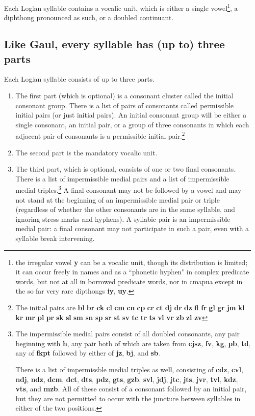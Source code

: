 \documentclass[12pt]{book}
\begin{document}
Each Loglan syllable contains a vocalic unit, which is either a single vowel\footnote{the irregular vowel {\bf y} can be a vocalic unit, though its distribution is limited; it can occur freely in names and as a ``phonetic hyphen"  in complex predicate words, but  not at all  in  borrowed predicate words, nor in cmapua except in the so far very rare dipthongs {\bf iy}, {\bf uy}.}, a diphthong pronounced as such, or a doubled continuant.


\subsection{Like Gaul, every syllable has (up to) three parts}


Each Loglan syllable consists of up to three parts.  
\begin{enumerate}

\item The first part (which is optional) is a consonant cluster called the initial consonant group.  There is a list of pairs of consonants  called permissible initial pairs (or just initial pairs).  An initial consonant group will be either a single consonant, an initial pair, or a group of three consonants in which each adjacent pair of consonants is a permissible initial pair.\footnote{The initial pairs are {\bf bl}  {\bf br}  {\bf ck}  {\bf cl}  {\bf cm}  {\bf cn}   {\bf cp}  {\bf cr}   {\bf ct}   {\bf dj}   {\bf dr}   {\bf dz}  {\bf fl}  {\bf fr}   {\bf gl}   {\bf gr}   {\bf jm}   {\bf kl}  {\bf kr}   {\bf mr}   {\bf pl}  {\bf pr}   {\bf sk}  {\bf sl}   {\bf sm}  {\bf sn}  {\bf sp}   {\bf sr}  {\bf st}  {\bf sv} {\bf tc}  {\bf tr}  {\bf ts}  {\bf vl}  {\bf vr} {\bf  zb}  {\bf  zl}  {\bf zv}}

\item The second part is the mandatory vocalic unit.

\item The third part, which is optional, consists of one or two final consonants.  There is a list of impermissible medial pairs and a list of impermissible medial triples.\footnote{The impermissible medial pairs consist of all doubled consonants, any pair beginning with {\bf h}, any pair both of which are taken from {\bf cjsz}, {\bf fv}, {\bf kg}, {\bf pb}, {\bf td},
any of {\bf fkpt} followed by either of {\bf jz}, {\bf bj}, and {\bf sb}.

There is a list of impermissble medial triples as well, consisting of {\bf cdz}, {\bf cvl}, {\bf ndj}, {\bf ndz}, {\bf dcm}, {\bf dct}, {\bf dts}, {\bf pdz}, {\bf gts}, {\bf gzb}, {\bf svl}, {\bf jdj}, {\bf jtc}, {\bf jts}, {\bf jvr}, {\bf tvl}, {\bf kdz}, {\bf vts}, and {\bf mzb}.  All of these consist of a consonant followed by an initial pair, but they are not permitted to occur with the juncture between syllables in either of the two positions.} A final consonant
may not be followed by a vowel and may not stand at the beginning of an impermissible medial pair or triple (regardless of whether the other consonants are in the same syllable, and ignoring stress marks and hyphens).  A syllabic pair is an impermissible medial pair:  a final consonant may not participate in such a pair, even with a syllable break intervening.


\end{enumerate}
\end{document}

